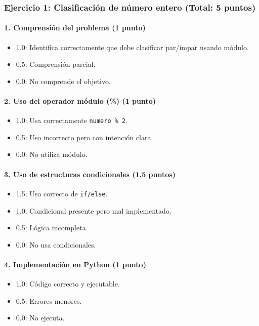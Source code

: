\begin{solution}

\subsubsection*{Ejercicio 1: Clasificación de número entero (Total: 5 puntos)}

\paragraph{1. Comprensión del problema (1 punto)}
\begin{itemize}
    \item 1.0: Identifica correctamente que debe clasificar par/impar usando módulo.
    \item 0.5: Comprensión parcial.
    \item 0.0: No comprende el objetivo.
\end{itemize}

\paragraph{2. Uso del operador módulo (\%) (1 punto)}
\begin{itemize}
    \item 1.0: Usa correctamente \texttt{numero \% 2}.
    \item 0.5: Uso incorrecto pero con intención clara.
    \item 0.0: No utiliza módulo.
\end{itemize}

\paragraph{3. Uso de estructuras condicionales (1.5 puntos)}
\begin{itemize}
    \item 1.5: Uso correcto de \texttt{if/else}.
    \item 1.0: Condicional presente pero mal implementado.
    \item 0.5: Lógica incompleta.
    \item 0.0: No usa condicionales.
\end{itemize}

\paragraph{4. Implementación en Python (1 punto)}
\begin{itemize}
    \item 1.0: Código correcto y ejecutable.
    \item 0.5: Errores menores.
    \item 0.0: No ejecuta.
\end{itemize}


\end{solution}
